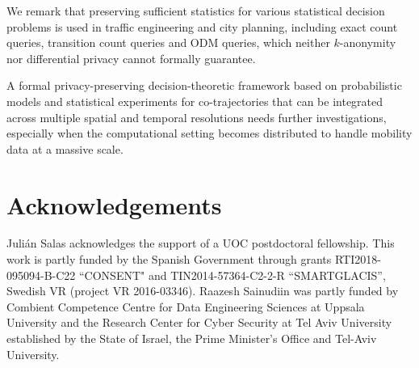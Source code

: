 \documentclass[times,twocolumn,final,authoryear]{elsarticle}
\begin{document}
We remark that preserving sufficient statistics for various statistical decision problems is used in traffic engineering and city planning, including exact count queries, transition count queries and ODM queries, which neither $k$-anonymity nor differential privacy cannot formally guarantee.


A formal privacy-preserving decision-theoretic framework based on probabilistic models and statistical experiments for co-trajectories that can be integrated across multiple spatial and temporal resolutions needs further investigations, especially when the computational setting becomes distributed to handle mobility data at a massive scale.

\section*{Acknowledgements}
Juli\'{a}n Salas acknowledges the support of a UOC postdoctoral fellowship.
This work is partly funded by the Spanish Government through grants  RTI2018-095094-B-C22 ``CONSENT" and TIN2014-57364-C2-2-R ``SMARTGLACIS'', Swedish VR (project VR 2016-03346). Raazesh Sainudiin was partly funded by Combient Competence Centre for Data Engineering Sciences at Uppsala University and the Research Center for Cyber Security at Tel Aviv University established by the State of Israel, the Prime Minister's Office and Tel-Aviv University.






\end{document}
